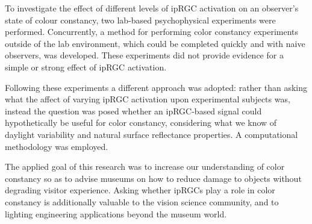 \documentclass{article}
\begin{document}
To investigate the effect of different levels of ipRGC activation on an observer's state of colour constancy,	two lab-based psychophysical experiments were performed. Concurrently, a method for performing color constancy experiments outside of the lab environment, which could be completed quickly and with naive observers, was developed. These experiments did not provide evidence for a simple or strong effect of ipRGC activation.

Following these experiments a different approach was adopted: rather than asking what the affect of varying ipRGC activation upon experimental subjects was, instead the question was posed whether an ipRGC-based signal could hypothetically be useful for color constancy, considering what we know of daylight variability and natural surface reflectance properties. A computational methodology was employed.

The applied goal of this research was to increase our understanding of color constancy so as to advise museums on how to reduce damage to objects without degrading visitor experience. Asking whether ipRGCs play a role in color constancy is additionally valuable to the vision science community, and to lighting engineering applications beyond the museum world.
\end{document}
